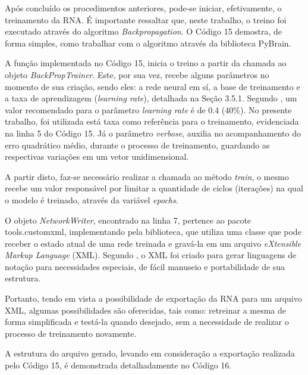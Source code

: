 Após concluído os procedimentos anteriores, pode-se iniciar, efetivamente, o treinamento da RNA. É importante ressaltar que, neste trabalho, o treino foi executado através do algoritmo \textit{Backpropagation}. O Código 15 demostra, de forma simples, como trabalhar com o algoritmo através da biblioteca PyBrain.



A função implementada no Código 15, inicia o treino a partir da chamada ao objeto \textit{BackPropTrainer}. Este, por sua vez, recebe alguns parâmetros no momento de sua criação, sendo eles: a rede neural em sí, a base de treinamento e a taxa de aprendizagem (\textit{learning rate}), detalhada na Seção 3.5.1. Segundo , um valor recomendado para o parâmetro \textit{learning rate} é de 0.4 (40\%). No presente trabalho, foi utilizada está taxa como referência para o treinamento, evidenciada na linha 5 do Código 15. Já o parâmetro \textit{verbose}, auxilia no acompanhamento do erro quadrático médio, durante o processo de treinamento, guardando as respectivas variações em um vetor unidimensional.

A partir disto, faz-se necessário realizar a chamada ao método \textit{train}, o mesmo recebe um valor responsável por limitar a quantidade de ciclos (iterações) na qual o modelo é treinado, através da variável \textit{epochs}.

O objeto \textit{NetworkWriter}, encontrado na linha 7, pertence ao pacote tools.customxml, implementando pela biblioteca, que utiliza uma classe que pode receber o estado atual de uma rede treinada e gravá-la em um arquivo \textit{eXtensible Markup Language} (XML). Segundo \cite{xml}, o XML foi criado para gerar linguagens de notação para necessidades especiais, de fácil manuseio e portabilidade de sua estrutura.

Portanto, tendo em vista a possibilidade de exportação da RNA para um arquivo XML, algumas possibilidades são oferecidas, tais como: retreinar a mesma de forma simplificada e testá-la quando desejado, sem a necessidade de realizar o processo de treinamento novamente.

A estrutura do arquivo gerado, levando em consideração a exportação realizada pelo Código 15, é demonstrada detalhadamente no Código 16.



